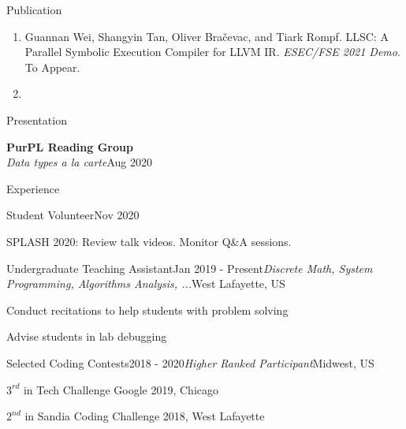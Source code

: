 \documentclass{resume} %
\begin{document}
\begin{rSection}{Publication}
\begin{enumerate}
    \item Guannan Wei, Shangyin Tan, Oliver Bračevac, and Tiark Rompf. LLSC: A Parallel Symbolic Execution Compiler for LLVM IR. \textit{ESEC/FSE 2021 Demo}. To Appear.
    \item {}
\end{enumerate}




\end{rSection}

\begin{rSection}{Presentation}


\textbf{PurPL Reading Group} \\
\textit{Data types a la carte}\hfill Aug 2020\\



\end{rSection}


\begin{rSection}{Experience}

\begin{rSubsection}{Student Volunteer}{Nov 2020}{}{}
\item SPLASH 2020: Review talk videos. Monitor Q\&A sessions.


\end{rSubsection}
\begin{rSubsection}{Undergraduate Teaching Assistant}{Jan 2019 - Present}{\textit{Discrete Math, System Programming, Algorithms Analysis, ...}}{West Lafayette, US}
\item Conduct recitations to help students with problem solving
\item Advise students in lab debugging
\end{rSubsection}

\begin{rSubsection}{Selected Coding Contests}{2018 - 2020}{\it Higher Ranked Participant}{Midwest, US}
\item $3^{rd}$ in Tech Challenge Google 2019, Chicago
\item $2^{nd}$ in Sandia Coding Challenge 2018, West Lafayette

\end{rSubsection}


\end{rSection}
\end{document}
